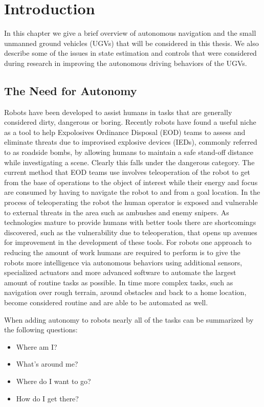\chapter{Introduction}
\label{ch:introduction}
In this chapter we give a brief overview of autonomous navigation and the small unmanned ground vehicles (UGVs) that will be considered in this thesis. We also describe some of the issues in state estimation and controls that were considered during research in improving the autonomous driving behaviors of the UGVs.

\section{The Need for Autonomy}
\label{sec:needforautonomy}
Robots have been developed to assist humans in tasks that are generally considered dirty, dangerous or boring. Recently robots have found a useful niche as a tool to help Expolosives Ordinance Disposal (EOD) teams to assess and eliminate threats due to improvised explosive devices (IEDs), commonly referred to as roadside bombs, by allowing humans to maintain a safe stand-off distance while investigating a scene. Clearly this falls under the dangerous category. The current method that EOD teams use involves teleoperation of the robot to get from the base of operations to the object of interest while their energy and focus are consumed by having to navigate the robot to and from a goal location. In the process of teleoperating the robot the human operator is exposed and vulnerable to external threats in the area such as ambushes and enemy snipers. As technologies mature to provide humans with better tools there are shortcomings discovered, such as the vulnerability due to teleoperation, that opens up avenues for improvement in the development of these tools. For robots one approach to reducing the amount of work humans are required to perform is to give the robots more intelligence via autonomous behaviors using additional sensors, specialized actuators and more advanced software to automate the largest amount of routine tasks as possible. In time more complex tasks, such as navigation over rough terrain, around obstacles and back to a home location, become considered routine and are able to be automated as well.

When adding autonomy to robots nearly all of the tasks can be summarized by the following questions:
\begin{itemize}
\item Where am I?
\item What's around me?
\item Where do I want to go?
\item How do I get there?
\end{itemize}

